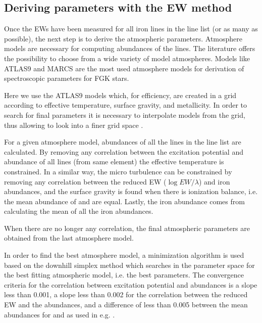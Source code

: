 \documentclass{aa}
\begin{document}
\subsection{Deriving parameters with the EW method}
\label{sec:deriving_parameters_with_the_ew_method}

Once the EWs have been measured for all iron lines in the line list (or as
many as possible), the next step is to derive the atmospheric parameters.
Atmosphere models are necessary for computing abundances of the lines.
The literature offers the possibility to choose from a wide variety
of model atmospheres. Models like ATLAS9 \citep{Kurucz1993} and
MARCS \citep{Gustafson2008} are the most used atmosphere models for
derivation of spectroscopic parameters for FGK stars.

Here we use the ATLAS9 models which, for efficiency, are created
in a grid according to effective temperature, surface gravity, and
metallicity. In order to search for final parameters it is necessary to
interpolate models from the grid, thus allowing to look into a finer
grid space \citep[see e.g.][]{Sousa2014}.

For a given atmosphere model, abundances of all the lines in the line
list are calculated. By removing any correlation between the excitation
potential and abundance of all lines (from same element) the effective
temperature is constrained. In a similar way, the micro turbulence
can be constrained by removing any correlation between the reduced EW
($\log EW/\lambda$) and iron abundances, and the surface gravity is
found when there is ionization balance, i.e. the mean abundance of
 and  are equal. Lastly, the iron abundance comes
from calculating the mean of all the iron abundances.

When there are no longer any correlation, the final atmospheric
parameters are obtained from the last atmosphere model.

In order to find the best atmosphere model, a minimization algorithm
is used based on the downhill simplex method \citep{Press1992}
which searches in the parameter space for the best fitting atmospheric
model, i.e. the best parameters.
The convergence criteria for the correlation between excitation
potential and abundances is a slope less than 0.001, a slope
less than 0.002 for the correlation between the reduced EW and
the abundances, and a difference of less than 0.005 between the
mean abundances for  and  as used in e.g.
\citet{Tsantaki2013,Sousa2008a}.
\end{document}

